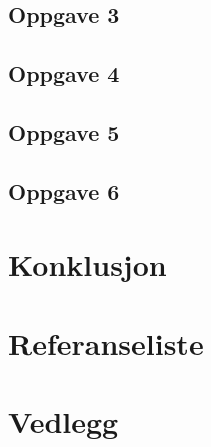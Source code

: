 \documentclass{article}
\begin{document}
\subsection{Oppgave 3} %
\label{sub:oppgave_3}

\newpage


\subsection{Oppgave 4} %
\label{sub:oppgave_4}

\newpage


\subsection{Oppgave 5} %
\label{sub:oppgave_5}

\clearpage


\subsection{Oppgave 6} %
\label{sub:oppgave_6}

\clearpage




\section{Konklusjon} %
\label{sec:konklusjon}

\newpage

\newpage
\section{Referanseliste}



\section{Vedlegg} %
\label{sec:vedlegg}

\end{document}
